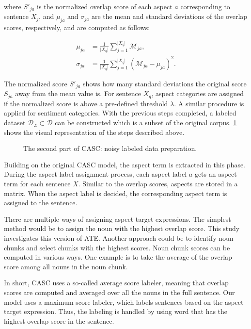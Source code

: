 \documentclass[american, oneside]{ecsgdp}
\begin{document}
\noindent where $S'_{ja}$ is the normalized overlap score of each aspect $a$ corresponding to sentence $X_j$, and $\mu_{ja}$ and $\sigma_{ja}$ are the mean and standard deviations of the overlap scores, respectively, and are computed as follows:

\begin{align}
    \mu_{ja}    & = \frac{1}{\lvert X_q \rvert} \sum_{j=1}^{\lvert X_q \rvert} \mathcal{M}_{ja}, \\
    \sigma_{ja} & = \frac{1}{\lvert X_q \rvert} \sum_{j=1}^{\lvert X_q \rvert} \left ( \mathcal{M}_{ja} - \mu_{ja} \right )^2.
\end{align}

The normalized score $S'_{ja}$ shows how many standard deviations the original score $S_{ja}$ away from the mean value is. For sentence $X_q$, aspect categories are assigned if the normalized score is above a pre-defined threshold $\lambda$. 
A similar procedure is applied for sentiment categories. With the previous steps completed, a labeled dataset $\mathcal{D}_\mathcal{L} \subset \mathcal{D}$ can be constructed which is a subset of the original corpus. \cref{fig:casc2} shows the visual representation of the steps described above.


\begin{figure}[htbp]
  \centering
  
  \caption{The second part of CASC: noisy labeled data preparation.}
  \label{fig:casc2}
\end{figure}

Building on the original CASC model, the aspect term is extracted in this phase. During the aspect label assignment process, each aspect label $a$ gets an aspect term for each sentence $X$. Similar to the overlap scores, aspects are stored in a matrix. When the aspect label is decided, the corresponding aspect term is assigned to the sentence.

There are multiple ways of assigning aspect target expressions. The simplest method would be to assign the noun with the highest overlap score. This study investigates this version of ATE. Another approach could be to identify noun chunks \parencite{Honnibal2020Spacy} and select chunks with the highest scores. Noun chunk scores can be computed in various ways. One example is to take the average of the overlap score among all nouns in the noun chunk. 

In short, CASC uses a so-called average score labeler, meaning that overlap scores are computed and averaged over all the nouns in the full sentence. Our model uses a maximum score labeler, which labels sentences based on the aspect target expression. Thus, the labeling is handled by using word that has the highest overlap score in the sentence.
\end{document}
